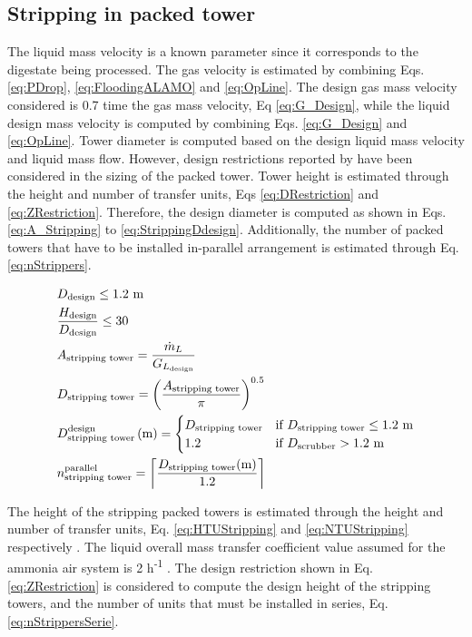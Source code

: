 \begin{refsection}[referencesApD]
\subsection{Stripping in packed tower}
The
liquid mass velocity is a known parameter since it corresponds to the digestate being processed. The
gas velocity is estimated by combining Eqs. \ref{eq:PDrop}, \ref{eq:FloodingALAMO} and \ref{eq:OpLine}. The design gas mass velocity considered is 0.7 time the
gas mass velocity, Eq \ref{eq:G_Design}, while the liquid design mass velocity is computed by combining Eqs. \ref{eq:G_Design} and \ref{eq:OpLine}. Tower diameter is computed based on the design liquid mass velocity and liquid mass flow. However, design restrictions reported by \citep{Branan2005} have been considered in the sizing of the packed tower.
Tower height is estimated through the height and number of transfer units, Eqs \ref{eq:DRestriction} and \ref{eq:ZRestriction}. Therefore, the design diameter is computed as shown in Eqs. \ref{eq:A_Stripping} to \ref{eq:StrippingDdesign}. Additionally, the number of packed towers that have to be installed in-parallel arrangement is estimated through Eq. \ref{eq:nStrippers}.

\begin{align}
&D_{\text{design}} \leq 1.2 \text{ m}  \label{eq:DRestriction}\\
& \frac{H_{\text{design}}}{D_{\text{design}}} \leq 30 \label{eq:ZRestriction}\\
& A_{\text{stripping tower}} = \frac{\dot{m}_L}{G_{L_{\text{design}}}} \label{eq:A_Stripping} \\
& D_{\text{stripping tower}} = \left(\frac{A_{\text{stripping tower}}}{\pi}\right)^{0.5} \label{eq:D_Stripping} \\
& D_{\text{stripping tower}}^{\text{design}} \left(\text{m}\right) =
\begin{cases}
D_{\text{stripping tower}} & \text{if } 	D_{\text{stripping tower}} \leq 1.2 \text{ m}  
\\
1.2 & \text{if }  D_{\text{scrubber}} > 1.2 \text{ m}
\end{cases} \label{eq:StrippingDdesign} \\
& n_{\text{stripping tower}}^{\text{parallel}} = \ceil*{\frac{D_{\text{stripping tower}}(\text{m})}{1.2}}\label{eq:nStrippers}
\end{align}

The height of the stripping packed towers is estimated through the height and number of transfer units, Eq. \ref{eq:HTUStripping} and \ref{eq:NTUStripping} respectively \citep{Metcalf2014}. The liquid overall mass transfer coefficient value assumed for the ammonia air system is 2 h\textsuperscript{-1} \citep{larsen2013so}. The design restriction shown in Eq. \ref{eq:ZRestriction} is considered to compute the design height of the stripping towers, and the number of units that must be installed in series, Eq. \ref{eq:nStrippersSerie}.


\end{refsection}
